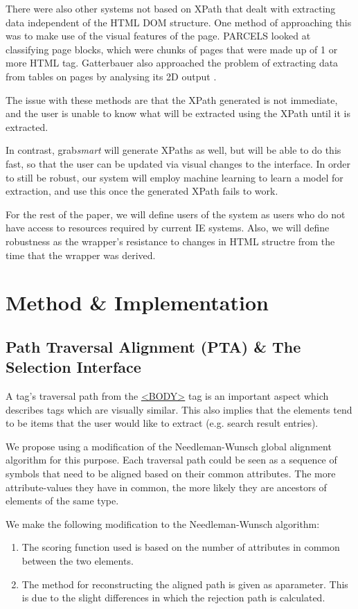 \documentclass[a4paper,12pt]{nurop}
\begin{document}
There were also other systems not based on XPath that
dealt with extracting data independent of the HTML DOM structure. One method of approaching
this was to make use of the visual features of the page. PARCELS \cite{Lee2004} looked at 
classifying page blocks, which were chunks of pages that were made up of 1 or more HTML tag.
Gatterbauer also approached the problem of extracting data from tables on pages by
analysing its 2D output \cite{Gatterbauer2007}.

The issue with these methods are that the XPath generated is not immediate, and the user is unable to know
what will be extracted using the XPath until it is extracted.

In contrast, grab\textit{smart} will generate XPaths as well, but will be able to do this fast, so that
the user can be updated via visual changes to the interface. In order
to still be robust, our system will employ machine learning to learn a model for extraction, and use this
once the generated XPath fails to work.

For the rest of the paper, we will define users of the system as users who do not have access to resources
required by current IE systems. Also, we will define robustness as the wrapper's resistance to changes in
HTML structre from the time that the wrapper was derived.

\section{Method \& Implementation}
\subsection{Path Traversal Alignment (PTA) \& The Selection Interface}
A tag's traversal path from the \url{<BODY>} tag is an important aspect which describes tags which are 
visually similar. This also implies that the elements tend to be items that the user would
like to extract (e.g. search result entries).

We propose using a modification of the Needleman-Wunsch \cite{Needleman1970} global
alignment algorithm for this purpose. Each traversal path could be seen as a sequence of
symbols that need to be aligned based on their common attributes. The more attribute-values
they have in common, the more likely they are ancestors of elements of the same type.

We make the following modification to the Needleman-Wunsch algorithm:
\begin{enumerate}
	\item The scoring function used is based on the number of attributes
	in common between the two elements.
	\item The method for reconstructing the aligned path is given as aparameter. This is due
	to the slight differences in which the rejection path is calculated.
\end{enumerate}
\end{document}
